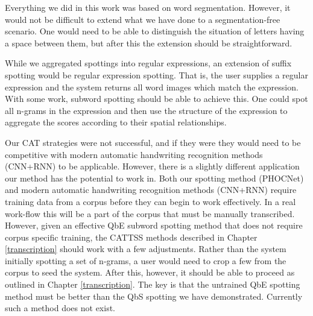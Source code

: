 \documentclass[ms,electronic,twosidetoc,letterpaper,chaptercenter,parttop,lof,lot]{byumsphd}
\begin{document}
Everything we did in this work was based on word segmentation. However, it would not be difficult to extend what we have done to a segmentation-free scenario. One would need to be able to distinguish the situation of letters having a space between them, but after this  the extension should be straightforward.

While we aggregated spottings into regular expressions, an extension of suffix spotting would be regular expression spotting. That is, the user supplies a regular expression and the system returns all word images which match the expression. With some work, subword spotting should be able to achieve this. One could spot all n-grams in the expression and then use the structure of the expression to aggregate the scores according to their spatial relationships.

Our CAT strategies were not successful, and if they were they would need to be competitive with modern automatic handwriting recognition methods (CNN+RNN) to be applicable. However, there is a slightly different application our method has the potential to work in.
Both our spotting method (PHOCNet) and modern automatic handwriting recognition methods (CNN+RNN) require training data from a corpus before they can begin to work effectively. In a real work-flow this will be a part of the corpus that must be manually transcribed. However, given an effective QbE subword spotting method that does not require corpus specific training, the CATTSS methods described in Chapter \ref{transcription} should work with a few adjustments. Rather than the system initially spotting a set of n-grams, a user would need to crop a few from the corpus to seed the system. After this, however, it should be able to proceed as outlined in Chapter \ref{transcription}.
The key is that the untrained QbE spotting method must be better than the QbS spotting we have demonstrated. Currently such a method does not exist.
\end{document}
